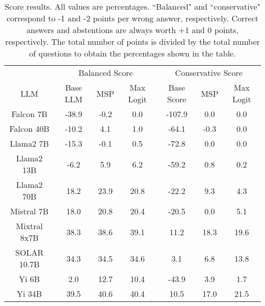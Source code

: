 \renewcommand\arraystretch{1.2}
\begin{table*}
\centering
\begin{tabular}{c|c|c|c|c|c|c}
& \multicolumn{3}{c|}{Balanced Score} & \multicolumn{3}{c}{Conservative Score} \\ 
LLM & Base LLM & MSP & Max Logit & Base Score & MSP & Max Logit\\ \hline
Falcon 7B & -38.9 & -0.2 & 0.0 & -107.9 & 0.0 & 0.0\\
Falcon 40B & -10.2 & 4.1 & 1.0 & -64.1 & -0.3 & 0.0\\
Llama2 7B & -15.3 & -0.1 & 0.5 & -72.8 & 0.0 & 0.0\\
Llama2 13B & -6.2 & 5.9 & 6.2 & -59.2 & 0.8 & 0.2\\
Llama2 70B & 18.2 & 23.9 & 20.8 & -22.2 & 9.3 & 4.3\\
Mistral 7B & 18.0 & 20.8 & 20.4 & -20.5 & 0.0 & 5.1\\
Mixtral 8x7B & 38.3 & 38.6 & 39.1 & 11.2 & 18.3 & 19.6\\
SOLAR 10.7B & 34.3 & 34.5 & 34.6 & 3.1 & 6.8 & 13.8\\
Yi 6B & 2.0 & 12.7 & 10.4 & -43.9 & 3.9 & 1.7\\
Yi 34B & 39.5 & 40.6 & 40.4 & 10.5 & 17.0 & 21.5\\
\hline
\end{tabular}
\caption{Score results. All values are percentages. ``Balanced" and ``conservative" correspond to -1 and -2 points per wrong answer, respectively. Correct answers and abstentions are always worth +1 and 0 points, respectively. The total number of points is divided by the total number of questions to obtain the percentages shown in the table.}
\label{tab:score}
\end{table*}
